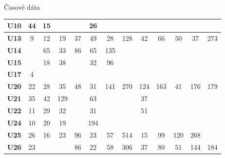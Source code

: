 \documentclass[xcolor={table}]{beamer}
\begin{document}
\begin{frame}{Časové dáta}
\begin{table}[]
\begin{tabular}{|c|c|c|c|c|c|c|c|c|c|c|c|c|}
\textbf{U10}   & 44           & 15           &              &              & 26           &              &              &              &              &              &              &              \\ \hline
\textbf{U13}   & 9            & 12           & 19           & 37           & 49           & 28           & 128          & 42           & 66           & 50           & 37           & 273          \\ \hline
\textbf{U14}   &              & 65           & 33           & 86           & 65           & 135          &              &              &              &              &              &              \\ \hline
\textbf{U15}   &              & 18           & 38           &              & 32           & 96           &              &              &              &              &              &              \\ \hline
\textbf{U17}   & 4            &              &              &              &              &              &              &              &              &              &              &              \\ \hline
\textbf{U20}   & 22           & 28           & 35           & 48           & 31           & 141          & 270          & 124          & 163          & 41           & 176          & 179          \\ \hline
\textbf{U21}   & 35           & 42           & 129          &              & 63           &              &              & 37           &              &              &              &              \\ \hline
\textbf{U22}   & 11           & 29           & 32           &              & 31           &              &              & 51           &              &              &              &              \\ \hline
\textbf{U24}   & 10           & 20           & 19           &              & 194          &              &              &              &              &              &              &              \\ \hline
\textbf{U25}   & 26           & 16           & 23           & 96           & 23           & 57           & 514          & 15           & 99           & 120          & 268          &              \\ \hline
\textbf{U26}   & 23           &              &              & 86           & 22           & 58           & 306          & 37           & 80           & 51           & 144          & 184          \\ \hline
\end{tabular}
\end{table}				
			\end{frame}			
\end{document}
